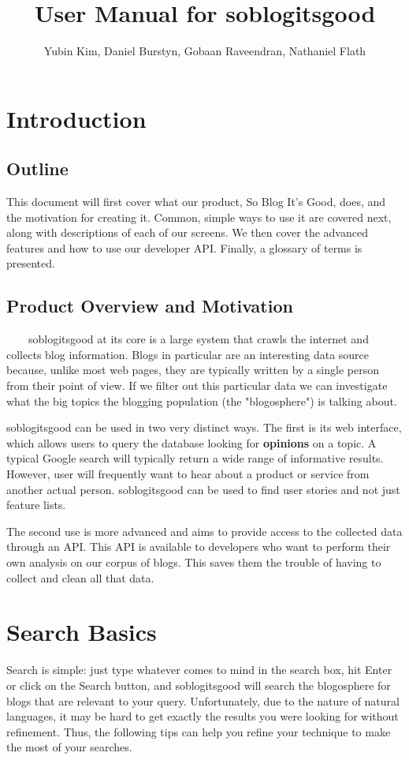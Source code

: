 \documentclass[titlepage]{article}
\title{User Manual for \textsf{soblogitsgood}}
\author{Yubin Kim, Daniel Burstyn, Gobaan Raveendran, Nathaniel Flath}
\begin{document}
\maketitle
\newpage
\tableofcontents
\newpage

\section{Introduction}

\subsection{Outline}
This document will first cover what our product, So Blog It's Good,
does, and the motivation for creating it.  Common, simple ways to use
it are covered next, along with descriptions of each of our screens.
We then cover the advanced features and how to use our developer API.
Finally, a glossary of terms is presented.

\subsection{Product Overview and Motivation}
\ \ \ \ \textsf{soblogitsgood} at its core is a large system that crawls the internet and
collects blog information.  Blogs in particular are an interesting data source
because, unlike most web pages, they are typically written by a single person
from their point of view.  If we filter out this particular data we can
investigate what the big topics the blogging population (the "blogosphere") is
talking about.

\textsf{soblogitsgood} can be used in two very distinct ways.  The first is its web
interface, which allows users to query the database looking for
\textbf{opinions} on a topic.  A typical Google search will typically return a
wide range of informative results.  However, user will frequently want to hear
about a product or service from another actual person.  \textsf{soblogitsgood} can be used
to find user stories and not just feature lists.

The second use is more advanced and aims to provide access to the collected
data through an API.  This API is available to developers who want to perform
their own analysis on our corpus of blogs.  This saves them the trouble of
having to collect and clean all that data.


\section{Search Basics}
Search is simple: just type whatever comes to mind in the search box, hit
Enter or click on the Search button, and \textsf{soblogitsgood} will search the
blogosphere for blogs that are relevant to your query.  Unfortunately, due to
the nature of natural languages, it may be hard to get exactly the results you
were looking for without refinement. Thus, the following tips can help you
refine your technique to make the most of your searches.
\end{document}
